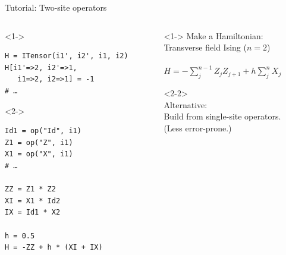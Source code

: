 \begin{frame}[fragile]{Tutorial: Two-site operators}

\begin{columns}

\begin{column}{4.5cm}

\begin{onlyenv}<1->
\begin{lstlisting}[language=JuliaLocal, style=julia, basicstyle=\small]
H = ITensor(i1', i2', i1, i2)
H[i1'=>2, i2'=>1,
   i1=>2, i2=>1] = -1
# …
\end{lstlisting}
\end{onlyenv}

\begin{onlyenv}<2->
\begin{lstlisting}[language=JuliaLocal, style=julia, basicstyle=\small]
Id1 = op("Id", i1)
Z1 = op("Z", i1)
X1 = op("X", i1)
# …

ZZ = Z1 * Z2
XI = X1 * Id2
IX = Id1 * X2

h = 0.5
H = -ZZ + h * (XI + IX)
\end{lstlisting}
\end{onlyenv}

\end{column}

\begin{column}{5.5cm}

\begin{onlyenv}<1->
Make a Hamiltonian: \\
Transverse field Ising ($n=2$) \\
~\\
$H = -\sum_j^{n-1} Z_j Z_{j+1} + h \sum_j^n X_j$
\end{onlyenv}

\begin{onlyenv}<2-2>
~\\
Alternative: \\
Build from single-site operators. \\
(Less error-prone.) \\
~\\
~\\
~\\
~\\
~\\
~\\
~\\
~\\
\end{onlyenv}


\end{column}
\end{columns}
\end{frame}
